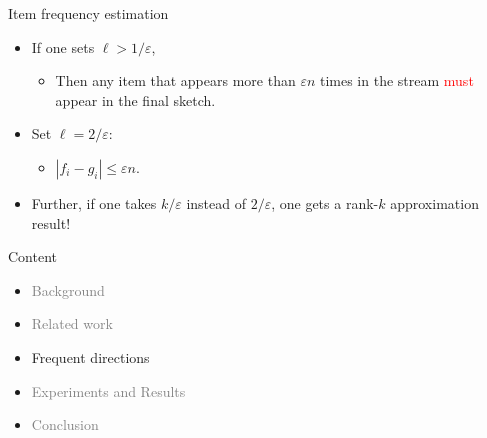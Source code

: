 \documentclass[first=dgreen,second=purple,logo=redque]{aaltoslides}
\begin{document}
\begin{frame}[allowframebreaks=1]{Item frequency estimation}
\framebreak

\begin{itemize}
	\item If one sets $\ell > 1/\varepsilon$,
		\begin{itemize} \item Then any item that appears \textcolor{dgreen}{more than}
			$\varepsilon n$ times in the stream \textcolor{red}{must} appear in
			the final sketch.\end{itemize}
	\item Set $\ell = 2/\varepsilon$:
		\begin{itemize}\item $|f_{i} - g_{i}| \leq \varepsilon n$.\end{itemize}
	\item Further, if one takes $k/\varepsilon$ instead of $2/\varepsilon$, one gets a rank-$k$ approximation result!\cite{Ghashami14}
\end{itemize}
 
\end{frame}


\begin{frame}{Content}
\begin{itemize}
\item \textcolor{gray}{Background}
\item \textcolor{gray}{Related work}
\item Frequent directions
\item \textcolor{gray}{Experiments and Results}
\item \textcolor{gray}{Conclusion}
\end{itemize}
\end{frame}

\end{document}

